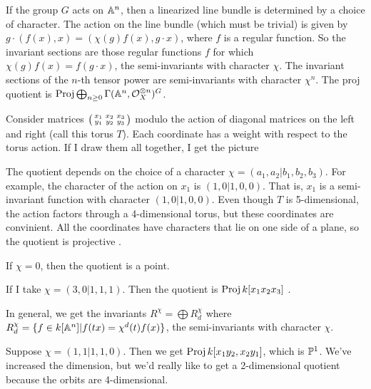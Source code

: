 
If the group $G$ acts on $\AA^n$, then a linearized line bundle is determined by a choice of character. The action on the line bundle (which must be trivial) is given by $g\cdot (f(x),x)=(\chi(g)f(x),g\cdot x)$, where $f$ is a regular function. So the invariant sections are those regular functions $f$ for which $\chi(g)f(x)=f(g\cdot x)$, the semi-invariants with character $\chi$. The invariant sections of the $n$-th tensor power are semi-invariants with character $\chi^n$. The proj quotient is $\proj \bigoplus_{n\ge 0} \Ga(\AA^n,\O_X^{\otimes n})^G$.

\begin{example}
 Consider matrices $\matx{x_1&x_2&x_3\\ y_1&y_2&y_3}$ modulo the action of diagonal matrices on the left and right (call this torus $T$). Each coordinate has a weight with respect to the torus action. If I draw them all together, I get the picture 
 
 The quotient depends on the choice of a character $\chi=(a_1,a_2|b_1,b_2,b_3)$. For example, the character of the action on $x_1$ is $(1,0|1,0,0)$. That is, $x_1$ is a semi-invariant function with character $(1,0|1,0,0)$. Even though $T$ is 5-dimensional, the action factors through a 4-dimensional torus, but these coordinates are convinient. All the coordinates have characters that lie on one side of a plane, so the quotient is projective .
 
 If $\chi=0$, then the quotient is a point.
 
 If I take $\chi=(3,0|1,1,1)$. Then the quotient is $\proj k[x_1x_2x_3]$ .
 
 In general, we get the invariants $R^\chi=\bigoplus R^\chi_d$ where $R^\chi_d=\{f\in k[\AA^n]|f(tx)=\chi^d(t)f(x)\}$, the semi-invariants with character $\chi$.
 
 Suppose $\chi=(1,1|1,1,0)$. Then we get $\proj k[x_1y_2,x_2y_1]$, which is $\PP^1$. We've increased the dimension, but we'd really like to get a 2-dimensional quotient because the orbits are 4-dimensional.
 

\end{example}
